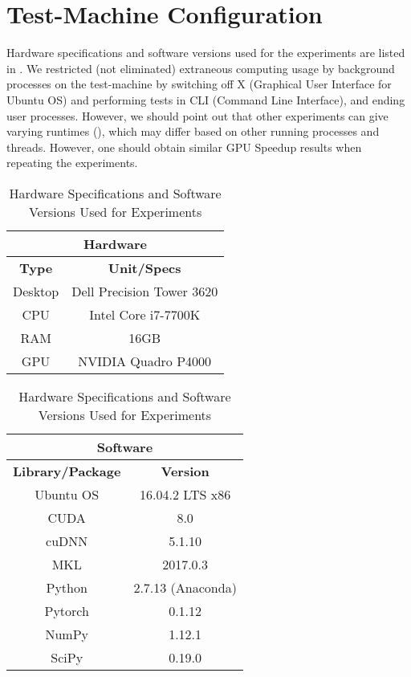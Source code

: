 \section{Test-Machine Configuration} \label{sec:Test-Machine Configuration}
Hardware specifications and software versions used for the experiments are listed in . We restricted (not eliminated) extraneous computing usage by background processes on the test-machine by switching off X (Graphical User Interface for Ubuntu OS) and performing tests in CLI (Command Line Interface), and ending user processes. However, we should point out that other experiments can give varying runtimes (), which may differ based on other running processes and threads. However, one should obtain similar GPU Speedup results when repeating the experiments.
\begin{table}[!htbp]
    \centering
    \caption{Hardware Specifications and Software Versions Used for Experiments}
    \label{tab:Hardware Specifications and Software Versions Used for Experiments}
    \begin{tabular}{|c|c|}
        \hline
        \multicolumn{2}{c}{\textbf{Hardware}}\\
        \hline
        \textbf{Type} & \textbf{Unit/Specs}\\
        \hline
        Desktop & Dell Precision Tower 3620\\
        CPU & Intel Core i7-7700K\footnotemark\\
        RAM & 16GB\\
        GPU & NVIDIA Quadro P4000\\
        \hline
    \end{tabular}\quad
    \begin{tabular}{|c|c|}
        \hline
        \multicolumn{2}{c}{\textbf{Software}}\\
        \hline
        \textbf{Library/Package} & \textbf{Version}\\
        \hline
        Ubuntu OS & 16.04.2 LTS x86\textunderscore64\\
        CUDA & 8.0\\
        cuDNN & 5.1.10\\
        MKL & 2017.0.3\\
        Python & 2.7.13 (Anaconda)\\
        Pytorch & 0.1.12\textunderscore2\\
        NumPy & 1.12.1\\
        SciPy & 0.19.0\\
        \hline
    \end{tabular}
\end{table}

